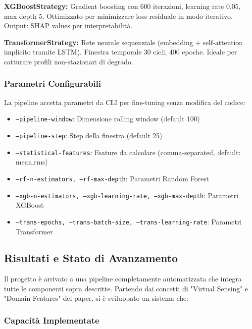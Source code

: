 \textbf{XGBoostStrategy:} Gradient boosting con 600 iterazioni, learning rate 0.05, max depth 5. Ottimizzato per minimizzare loss residuale in modo iterativo. Output: SHAP values per interpretabilità.

\textbf{TransformerStrategy:} Rete neurale sequenziale (embedding + self-attention implicito tramite LSTM). Finestra temporale 30 cicli, 400 epoche. Ideale per catturare profili non-stazionari di degrado.

\subsubsection{Parametri Configurabili}

La pipeline accetta parametri da CLI per fine-tuning senza modifica del codice:
\begin{itemize}
    \item \texttt{--pipeline-window}: Dimensione rolling window (default 100)
    \item \texttt{--pipeline-step}: Step della finestra (default 25)
    \item \texttt{--statistical-features}: Feature da calcolare (comma-separated, default: mean,rms)
    \item \texttt{--rf-n-estimators, --rf-max-depth}: Parametri Random Forest
    \item \texttt{--xgb-n-estimators, --xgb-learning-rate, --xgb-max-depth}: Parametri XGBoost
    \item \texttt{--trans-epochs, --trans-batch-size, --trans-learning-rate}: Parametri Transformer
\end{itemize}

\subsection{Risultati e Stato di Avanzamento}

Il progetto è arrivato a una pipeline completamente automatizzata che integra tutte le componenti sopra descritte. Partendo dai concetti di "Virtual Sensing" e "Domain Features" del paper, si è sviluppato un sistema che:

\subsubsection{Capacità Implementate}

